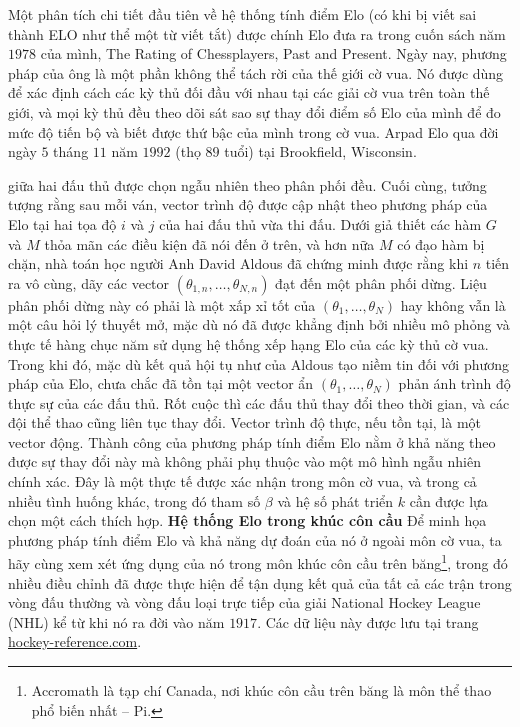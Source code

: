 \begin{tBox}
		\vskip 0.05cm
		Một phân tích chi tiết đầu tiên về hệ thống tính điểm Elo (có khi bị viết sai thành ELO như thể một từ viết tắt) được chính Elo đưa ra trong cuốn sách năm $1978$ của mình, The Rating of Chessplayers, Past and Present. Ngày nay, phương pháp của ông là một phần không thể tách rời của thế giới cờ vua. Nó được dùng để xác định cách các kỳ thủ đối đầu với nhau tại các giải cờ vua trên toàn thế giới, và mọi kỳ thủ đều theo dõi sát sao sự thay đổi điểm số Elo của mình để đo mức độ tiến bộ và biết được thứ bậc của mình trong cờ vua.
		\vskip 0.05cm
		Arpad Elo qua đời ngày $5$ tháng $11$ năm $1992$ (thọ $89$ tuổi) tại Brookfield, Wisconsin.
		\vspace*{-3pt}
	\end{tBox}
	\begin{multicols}{2}
	giữa hai đấu thủ được chọn ngẫu nhiên theo phân phối đều. Cuối cùng, tưởng tượng rằng sau mỗi ván, vector trình độ được cập nhật theo phương pháp của Elo tại hai tọa độ $i$ và $j$ của hai đấu thủ vừa thi đấu.
	\vskip 0.05cm
	Dưới giả thiết các hàm $G$ và $M$ thỏa mãn các điều kiện đã nói đến ở trên, và hơn nữa $M$ có đạo hàm bị chặn, nhà toán học người Anh David Aldous đã chứng minh được rằng khi $n$ tiến ra vô cùng, dãy các vector $(\theta_{1, n}, \dots, \theta_{N, n})$ đạt đến một phân phối dừng. Liệu phân phối dừng này có phải là một xấp xỉ tốt của $(\theta_1, \dots, \theta_N)$ hay không vẫn là một câu hỏi lý thuyết mở, mặc dù nó đã được khẳng định bởi nhiều mô phỏng và thực tế hàng chục năm sử dụng hệ thống xếp hạng Elo của các kỳ thủ cờ vua.
	\vskip 0.05cm
	Trong khi đó, mặc dù kết quả hội tụ như của Aldous tạo niềm tin đối với phương pháp của Elo, chưa chắc đã tồn tại một vector ẩn $(\theta_1, \dots, \theta_N)$ phản ánh trình độ thực sự của các đấu thủ. Rốt cuộc thì các đấu thủ thay đổi theo thời gian, và các đội thể thao cũng liên tục thay đổi. Vector trình độ thực, nếu tồn tại, là một vector động.
	\vskip 0.05cm
	Thành công của phương pháp tính điểm Elo nằm ở khả năng theo được sự thay đổi này mà không phải phụ thuộc vào một mô hình ngẫu nhiên chính xác. Đây là một thực tế được xác nhận trong môn cờ vua, và trong cả nhiều tình huống khác, trong đó tham số $\beta$ và hệ số phát triển $k$ cần được lựa chọn một cách thích hợp.
	\vskip 0.05cm
	\textbf{\color{toanhocdoisong}Hệ thống Elo trong khúc côn cầu}
	\vskip 0.05cm
	Để minh họa phương pháp tính điểm Elo và khả năng dự đoán của nó ở ngoài môn cờ vua, ta hãy cùng xem xét ứng dụng của nó trong môn khúc côn cầu trên băng\footnote[4]{\color{toanhocdoisong}Accromath là tạp chí Canada, nơi khúc côn cầu trên băng là môn thể thao phổ biến nhất -- Pi.}, trong đó nhiều điều chỉnh đã được thực hiện để tận dụng kết quả của tất cả các trận trong vòng đấu thường và vòng đấu loại trực tiếp của giải National Hockey League (NHL) kể từ khi nó ra đời vào năm $1917$. Các dữ liệu này được lưu tại trang \url{hockey-reference.com}.

\end{multicols}
